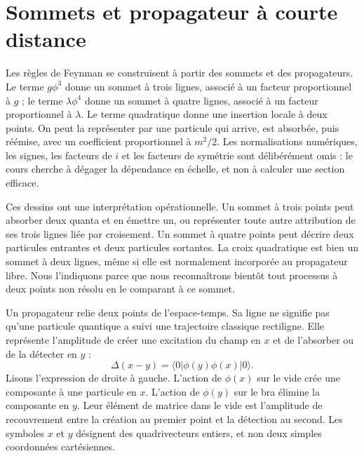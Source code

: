 \begin{classroomqa}
\end{classroomqa}

\section{Sommets et propagateur à courte distance}

Les règles de Feynman se construisent à partir des sommets et des propagateurs. Le terme \(g\phi^3\) donne un sommet à trois lignes, associé à un facteur proportionnel à \(g\) ; le terme \(\lambda\phi^4\) donne un sommet à quatre lignes, associé à un facteur proportionnel à \(\lambda\). Le terme quadratique donne une insertion locale à deux points. On peut la représenter par une particule qui arrive, est absorbée, puis réémise, avec un coefficient proportionnel à \(m^2/2\). Les normalisations numériques, les signes, les facteurs de \(i\) et les facteurs de symétrie sont délibérément omis : le cours cherche à dégager la dépendance en échelle, et non à calculer une section efficace.

Ces dessins ont une interprétation opérationnelle. Un sommet à trois points peut absorber deux quanta et en émettre un, ou représenter toute autre attribution de ses trois lignes liée par croisement. Un sommet à quatre points peut décrire deux particules entrantes et deux particules sortantes. La croix quadratique est bien un sommet à deux lignes, même si elle est normalement incorporée au propagateur libre. Nous l’indiquons parce que nous reconnaîtrons bientôt tout processus à deux points non résolu en le comparant à ce sommet.

Un propagateur relie deux points de l’espace-temps. Sa ligne ne signifie pas qu’une particule quantique a suivi une trajectoire classique rectiligne. Elle représente l’amplitude de créer une excitation du champ en \(x\) et de l’absorber ou de la détecter en \(y\) :
\begin{equation}
\Delta(x-y)=\langle0|\phi(y)\phi(x)|0\rangle.
\label{eq:position-propagator}
\end{equation}
Lisons l’expression de droite à gauche. L’action de \(\phi(x)\) sur le vide crée une composante à une particule en \(x\). L’action de \(\phi(y)\) sur le bra élimine la composante en \(y\). Leur élément de matrice dans le vide est l’amplitude de recouvrement entre la création au premier point et la détection au second. Les symboles \(x\) et \(y\) désignent des quadrivecteurs entiers, et non deux simples coordonnées cartésiennes.

